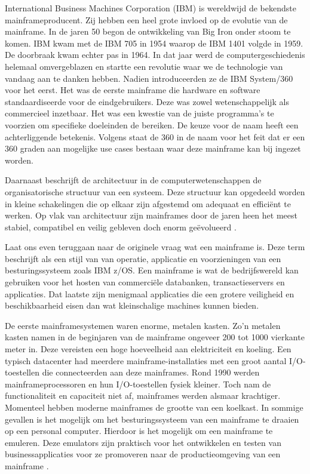 International Business Machines Corporation (IBM) is wereldwijd de bekendste mainframeproducent. Zij hebben een heel grote invloed op de evolutie van de mainframe. In de jaren 50 begon de ontwikkeling van Big Iron onder stoom te komen. IBM kwam met de IBM 705 in 1954 waarop de IBM 1401 volgde in 1959. De doorbraak kwam echter pas in 1964. In dat jaar werd de computergeschiedenis helemaal omvergeblazen en startte een revolutie waar we de technologie van vandaag aan te danken hebben. Nadien introduceerden ze de IBM System/360 voor het eerst. Het was de eerste mainframe die hardware en software standaardiseerde voor de eindgebruikers. Deze was zowel wetenschappelijk als commercieel inzetbaar. Het was een kwestie van de juiste programma's te voorzien om specifieke doeleinden de bereiken. De keuze voor de naam heeft een achterliggende betekenis. Volgens \textcite{Ebbers2022} staat de 360 in de naam voor het feit dat er een 360 graden aan mogelijke use cases bestaan waar deze mainframe kan bij ingezet worden.

Daarnaast beschrijft de architectuur in de computerwetenschappen  de organisatorische structuur van een systeem. Deze structuur kan opgedeeld worden in kleine schakelingen die op elkaar zijn afgestemd om adequaat en efficiënt te werken. Op vlak van architectuur zijn mainframes door de jaren heen het meest stabiel, compatibel en veilig gebleven doch enorm geëvolueerd  \autocite{Ebbers2022}. 

Laat ons even teruggaan naar de originele vraag wat een mainframe is. Deze term beschrijft \textcite{Ebbers2022} als een stijl van van operatie, applicatie en voorzieningen van een besturingssysteem zoals IBM z/OS. Een mainframe is wat de bedrijfswereld kan gebruiken voor het hosten van commerciële databanken, transactieservers en applicaties. Dat laatste zijn menigmaal applicaties die een grotere veiligheid en beschikbaarheid eisen dan wat kleinschalige machines kunnen bieden. 

De eerste mainframesystemen waren enorme, metalen kasten. Zo'n metalen kasten namen in de beginjaren van de mainframe ongeveer 200 tot 1000 vierkante meter in. Deze vereisten een hoge hoeveelheid aan elektriciteit en koeling. Een typisch datacenter had meerdere mainframe-installaties met een groot aantal I/O-toestellen die connecteerden aan deze mainframes. Rond 1990 werden mainframeprocessoren en hun I/O-toestellen fysiek kleiner. Toch nam de functionaliteit en capaciteit niet af, mainframes werden alsmaar krachtiger. Momenteel hebben moderne mainframes de grootte van een koelkast. In sommige gevallen is het mogelijk om het besturingssysteem van een mainframe te draaien op een personal computer. Hierdoor is het mogelijk om een mainframe te emuleren. Deze emulators zijn praktisch voor het ontwikkelen en testen van businessapplicaties voor ze promoveren naar de productieomgeving van een mainframe  \autocite{Ebbers2022}. 

